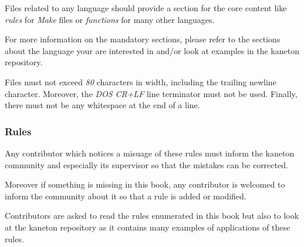 Files related to any language should provide a section for the core
content like \textit{rules} for \textit{Make} files or \textit{functions}
for many other languages.

For more information on the mandatory sections, please refer to
the sections about the language your are interested in and/or look at
examples in the kaneton repository.

Files must not exceed \textit{80} characters in width, including
the trailing newline character. Moreover, the \textit{DOS} \textit{CR+LF}
line terminator must not be used. Finally, there must not be any whitespace
at the end of a line.


\subsubsection{Rules}

Any contributor which notices a misuage of these rules must inform the
kaneton community and especially its supervisor so that the mistakes can be
corrected.

Moreover if something is missing in this book, any contributor is welcomed
to inform the community about it so that a rule is added or modified.

Contributors are asked to read the rules enumerated in this book but also
to look at the kaneton repository as it contains many examples of applications
of these rules.

